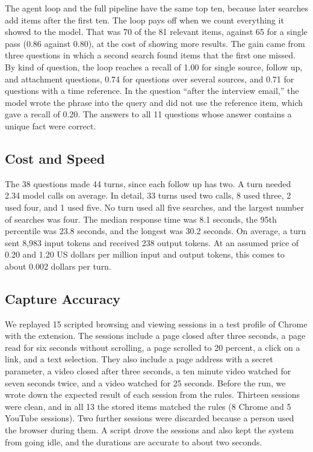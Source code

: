 \documentclass[conference]{IEEEtran}
\begin{document}
The agent loop and the full pipeline have the same top ten, because later searches add items after the first ten. The loop pays off when we count everything it showed to the model. That was 70 of the 81 relevant items, against 65 for a single pass (0.86 against 0.80), at the cost of showing more results. The gain came from three questions in which a second search found items that the first one missed. By kind of question, the loop reaches a recall of 1.00 for single source, follow up, and attachment questions, 0.74 for questions over several sources, and 0.71 for questions with a time reference. In the question ``after the interview email,'' the model wrote the phrase into the query and did not use the reference item, which gave a recall of 0.20. The answers to all 11 questions whose answer contains a unique fact were correct.

\subsection{Cost and Speed}
The 38 questions made 44 turns, since each follow up has two. A turn needed 2.34 model calls on average. In detail, 33 turns used two calls, 8 used three, 2 used four, and 1 used five. No turn used all five searches, and the largest number of searches was four. The median response time was 8.1 seconds, the 95th percentile was 23.8 seconds, and the longest was 30.2 seconds. On average, a turn sent 8,983 input tokens and received 238 output tokens. At an assumed price of 0.20 and 1.20 US dollars per million input and output tokens, this comes to about 0.002 dollars per turn.

\subsection{Capture Accuracy}
We replayed 15 scripted browsing and viewing sessions in a test profile of Chrome with the extension. The sessions include a page closed after three seconds, a page read for six seconds without scrolling, a page scrolled to 20 percent, a click on a link, and a text selection. They also include a page address with a secret parameter, a video closed after three seconds, a ten minute video watched for seven seconds twice, and a video watched for 25 seconds. Before the run, we wrote down the expected result of each session from the rules. Thirteen sessions were clean, and in all 13 the stored items matched the rules (8 Chrome and 5 YouTube sessions). Two further sessions were discarded because a person used the browser during them. A script drove the sessions and also kept the system from going idle, and the durations are accurate to about two seconds.
\end{document}
